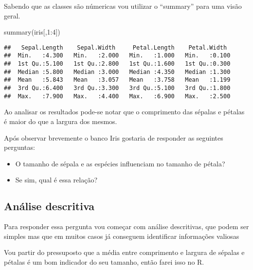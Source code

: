 \documentclass[
]{book}
\newenvironment{Shaded}{\begin{snugshade}}{\end{snugshade}}
\newcommand{\DecValTok}[1]{\textcolor[rgb]{0.00,0.00,0.81}{#1}}
\newcommand{\FunctionTok}[1]{\textcolor[rgb]{0.00,0.00,0.00}{#1}}
\newcommand{\NormalTok}[1]{#1}
\newcommand{\SpecialCharTok}[1]{\textcolor[rgb]{0.00,0.00,0.00}{#1}}
\providecommand{\tightlist}{%
  \setlength{\itemsep}{0pt}\setlength{\parskip}{0pt}}
\begin{document}
Sabendo que as classes são númericas vou utilizar o ``summary'' para uma visão geral.

\begin{Shaded}
\begin{Highlighting}[]
\FunctionTok{summary}\NormalTok{(iris[,}\DecValTok{1}\SpecialCharTok{:}\DecValTok{4}\NormalTok{])}
\end{Highlighting}
\end{Shaded}

\begin{verbatim}
##   Sepal.Length    Sepal.Width     Petal.Length    Petal.Width   
##  Min.   :4.300   Min.   :2.000   Min.   :1.000   Min.   :0.100  
##  1st Qu.:5.100   1st Qu.:2.800   1st Qu.:1.600   1st Qu.:0.300  
##  Median :5.800   Median :3.000   Median :4.350   Median :1.300  
##  Mean   :5.843   Mean   :3.057   Mean   :3.758   Mean   :1.199  
##  3rd Qu.:6.400   3rd Qu.:3.300   3rd Qu.:5.100   3rd Qu.:1.800  
##  Max.   :7.900   Max.   :4.400   Max.   :6.900   Max.   :2.500
\end{verbatim}

Ao analisar os resultados pode-se notar que o comprimento das sépalas e pétalas é maior do que a largura dos mesmos.

Após observar brevemente o banco Iris gostaria de responder as seguintes perguntas:

\begin{itemize}
\tightlist
\item
  O tamanho de sépala e as espécies influenciam no tamanho de pétala?
\item
  Se sim, qual é essa relação?
\end{itemize}

\hypertarget{anuxe1lise-descritiva}{%
\subsection{Análise descritiva}\label{anuxe1lise-descritiva}}

Para responder essa pergunta vou começar com análise descritivas, que podem ser simples mas que em muitos casos já conseguem identificar informações valiosas

Vou partir do pressuposto que a média entre comprimento e largura de sépalas e pétalas é um bom indicador do seu tamanho, então farei isso no R.
\end{document}
